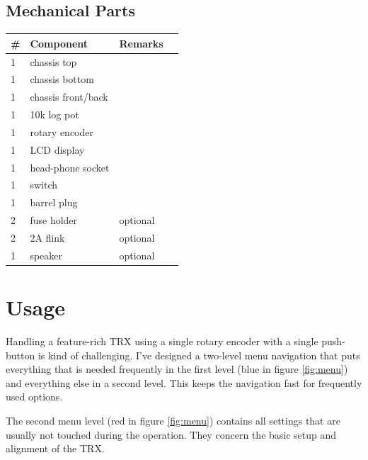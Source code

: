 \documentclass[10pt, a4paper,twoside]{scrartcl}
\begin{document}
\subsection{Mechanical Parts}
\begin{longtable}{|l|p{6cm}|l|l|} \hline 
\# & Component & Remarks \\ \hline 
1 & chassis top & \\
1 & chassis bottom & \\
1 & chassis front/back & \\
1 & 10k log pot & \\
1 & rotary encoder & \\
1 & LCD display & \\
1 & head-phone socket & \\
1 & switch & \\
1 & barrel plug & \\
2 & fuse holder & optional \\
2 & 2A flink & optional \\
1 & speaker & optional \\ \hline
\end{longtable}


\cleardoublepage
\section{Usage} \label{sec:user}
Handling a feature-rich TRX using a single rotary encoder with a single push-button is kind of challenging. I've designed a two-level menu navigation that puts everything that is needed frequently in the first level (blue in figure \ref{fig:menu}) and everything else in a second level. This keeps the navigation fast for frequently used options. 

The second menu level (red in figure \ref{fig:menu}) contains all settings that are usually not touched during the operation. They concern the basic setup and alignment of the TRX. 
\end{document}
